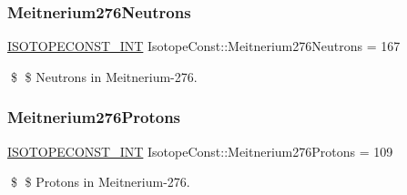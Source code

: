\subsubsection{\texorpdfstring{Meitnerium276\+Neutrons}{Meitnerium276Neutrons}}
{\footnotesize\ttfamily \mbox{\hyperlink{group___isotope_const-_macros_ga5f18360b3e99483a35c32d789e62621c}{I\+S\+O\+T\+O\+P\+E\+C\+O\+N\+S\+T\+\_\+\+I\+NT}} Isotope\+Const\+::\+Meitnerium276\+Neutrons = 167}

\$ \$ Neutrons in Meitnerium-\/276. \mbox{\label{group___isotope_const-_meitnerium-_mt276_gad70a1d0e6f1df2903f47e9a869d5d596}} 
\subsubsection{\texorpdfstring{Meitnerium276\+Protons}{Meitnerium276Protons}}
{\footnotesize\ttfamily \mbox{\hyperlink{group___isotope_const-_macros_ga5f18360b3e99483a35c32d789e62621c}{I\+S\+O\+T\+O\+P\+E\+C\+O\+N\+S\+T\+\_\+\+I\+NT}} Isotope\+Const\+::\+Meitnerium276\+Protons = 109}

\$ \$ Protons in Meitnerium-\/276. 